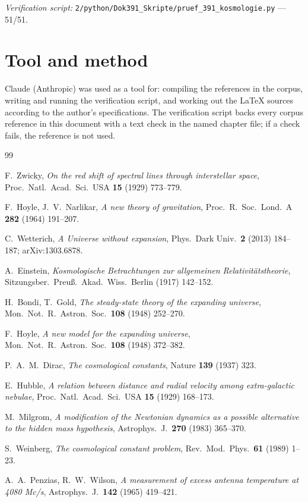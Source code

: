 \vspace{1em}
\noindent\textit{Verification script:} \texttt{2/python/Dok391\_Skripte/pruef\_391\_kosmologie.py}
--- 51/51.

\section*{Tool and method}

Claude (Anthropic) was used as a tool for: compiling the references in the corpus, writing and
running the verification script, and working out the \LaTeX{} sources according to the author's
specifications. The verification script backs every corpus reference in this document with a text
check in the named chapter file; if a check fails, the reference is not used.

\begin{thebibliography}{99}

F.~Zwicky, \textit{On the red shift of spectral lines through interstellar space},
Proc.\ Natl.\ Acad.\ Sci.\ USA \textbf{15} (1929) 773--779.

F.~Hoyle, J.~V.~Narlikar, \textit{A new theory of gravitation},
Proc.\ R.\ Soc.\ Lond.\ A \textbf{282} (1964) 191--207.

C.~Wetterich, \textit{A Universe without expansion},
Phys.\ Dark Univ.\ \textbf{2} (2013) 184--187; arXiv:1303.6878.

A.~Einstein, \textit{Kosmologische Betrachtungen zur allgemeinen Relativitätstheorie},
Sitzungsber.\ Preuß.\ Akad.\ Wiss.\ Berlin (1917) 142--152.

H.~Bondi, T.~Gold, \textit{The steady-state theory of the expanding universe},
Mon.\ Not.\ R.\ Astron.\ Soc.\ \textbf{108} (1948) 252--270.

F.~Hoyle, \textit{A new model for the expanding universe},
Mon.\ Not.\ R.\ Astron.\ Soc.\ \textbf{108} (1948) 372--382.

P.~A.~M.~Dirac, \textit{The cosmological constants}, Nature \textbf{139} (1937) 323.

E.~Hubble, \textit{A relation between distance and radial velocity among extra-galactic nebulae},
Proc.\ Natl.\ Acad.\ Sci.\ USA \textbf{15} (1929) 168--173.

M.~Milgrom, \textit{A modification of the Newtonian dynamics as a possible alternative to the
hidden mass hypothesis}, Astrophys.\ J.\ \textbf{270} (1983) 365--370.

S.~Weinberg, \textit{The cosmological constant problem}, Rev.\ Mod.\ Phys.\ \textbf{61} (1989) 1--23.

A.~A.~Penzias, R.~W.~Wilson, \textit{A measurement of excess antenna temperature at 4080 Mc/s},
Astrophys.\ J.\ \textbf{142} (1965) 419--421.

\end{thebibliography}
